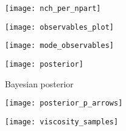\documentclass[aps,prc,reprint,amsmath]{revtex4-1}
\begin{document}
\begin{figure}
    \texttt{[image: nch\_per\_npart]}
\end{figure}

\begin{figure*}
    \texttt{[image: observables\_plot]}
\end{figure*}

\begin{figure*}
    \texttt{[image: mode\_observables]}
\end{figure*}

\begin{figure*}
    \texttt{[image: posterior]}
    \caption{Bayesian posterior}
\end{figure*}

\begin{figure}
    \centering
    \texttt{[image: posterior\_p\_arrows]}
\end{figure}

\begin{figure}
    \texttt{[image: viscosity\_samples]}
\end{figure}


\end{document}
